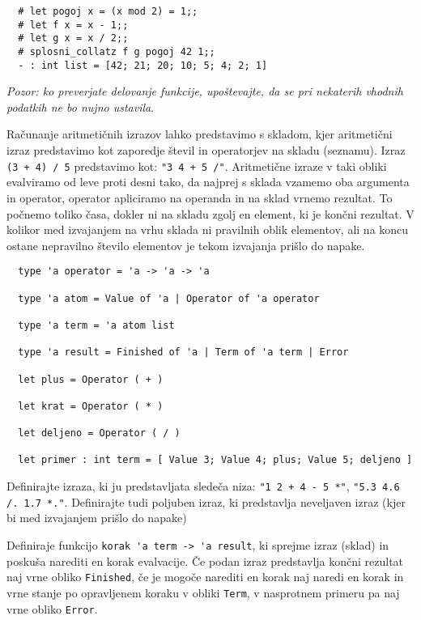 \documentclass[arhiv]{../izpit}
\begin{document}
\begin{verbatim}
  # let pogoj x = (x mod 2) = 1;;
  # let f x = x - 1;;
  # let g x = x / 2;;
  # splosni_collatz f g pogoj 42 1;;
  - : int list = [42; 21; 20; 10; 5; 4; 2; 1]
\end{verbatim}

\emph{Pozor: ko preverjate delovanje funkcije, upoštevajte, da se pri nekaterih vhodnih podatkih ne bo nujno ustavila}.


\naloga

Računanje aritmetičnih izrazov lahko predstavimo s skladom, kjer aritmetični izraz predstavimo kot 
zaporedje števil in operatorjev na skladu (seznamu). 
Izraz \verb|(3 + 4) / 5| predstavimo kot: \verb|"3 4 + 5 /"|. 
Aritmetične izraze v taki obliki evalviramo od leve proti desni tako, da najprej s sklada vzamemo 
oba argumenta in operator, operator apliciramo na operanda in na sklad vrnemo rezultat. 
To počnemo toliko časa, dokler ni na skladu zgolj en element, ki je končni rezultat. 
V kolikor med izvajanjem na vrhu sklada ni pravilnih oblik elementov, ali na koncu ostane nepravilno 
število elementov je tekom izvajanja prišlo do napake.  

\begin{verbatim}
  type 'a operator = 'a -> 'a -> 'a

  type 'a atom = Value of 'a | Operator of 'a operator
  
  type 'a term = 'a atom list
  
  type 'a result = Finished of 'a | Term of 'a term | Error
  
  let plus = Operator ( + )
  
  let krat = Operator ( * )
  
  let deljeno = Operator ( / )
  
  let primer : int term = [ Value 3; Value 4; plus; Value 5; deljeno ]    
\end{verbatim}

\podnaloga Definirajte izraza, ki ju predstavljata sledeča niza: \verb|"1 2 + 4 - 5 *"|, \verb|"5.3 4.6 /. 1.7 *."|. 
   Definirajte tudi poljuben izraz, ki predstavlja neveljaven izraz (kjer bi med izvajanjem prišlo do napake)

\podnaloga
Definiraje funkcijo \verb|korak 'a term -> 'a result|, ki sprejme izraz (sklad) in poskuša narediti en korak evalvacije.
Če podan izraz predstavlja končni rezultat naj vrne obliko \verb|Finished|, 
če je mogoče narediti en korak naj naredi en korak in vrne stanje po opravljenem koraku v obliki \verb|Term|, 
v nasprotnem primeru pa naj vrne obliko \verb|Error|.
\end{document}
